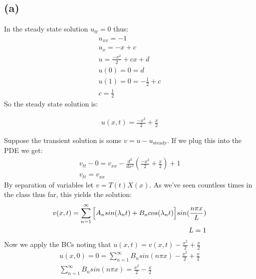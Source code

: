 \documentclass{article}
\begin{document}
\subsection*{\textbf{(a)}}
In the steady state solution $u_{tt} = 0$ thus:
\begin{equation}
\begin{aligned}
u_{xx} = - 1\\
u_x = -x + c\\
u = \frac{-x^2}{2} + cx + d\\
u(0)= 0 = d\\
u(1) = 0 = -\frac{1}{2} + c\\
c = \frac{1}{2}
\end{aligned}
\end{equation}
So the steady state solution is:
\begin{tcolorbox}[minipage,colback=white,arc=0pt,outer arc=0pt]
\begin{equation}
\begin{aligned}
u(x,t)  = \frac{-x^2}{2} + \frac{x}{2}
\end{aligned}
\end{equation}
\end{tcolorbox}
Suppose the transient solution is some $v = u - u_{\text{steady}}$. If we plug this into the PDE we get:
\begin{equation}
\begin{aligned}
v_{tt} - 0 = v_{xx} - \frac{d^2}{dx^2}(\frac{-x^2}{2} + \frac{x}{2}) + 1\\
v_{tt} = v_{xx}
\end{aligned}
\end{equation}
By separation of variables let $v=T(t)X(x)$. As we've seen countless times in the class thus far, this yields the solution:
\begin{equation}
\begin{aligned}
v(x,t) = \sum_{n=1}^{\infty} \Big{[}A_nsin(\lambda_n t) + B_ncos(\lambda_n t) \Big{]}sin(\frac{n\pi x}{L})\\
L = 1\\
\end{aligned}
\end{equation}
Now we apply the BCs noting that $u(x,t) = v(x,t) - \frac{x^2}{2} + \frac{x}{2}$\\
\begin{equation}
\begin{aligned}
u(x,0) = 0 = \sum_{n=1}^{\infty}B_nsin(n\pi x)- \frac{x^2}{2} + \frac{x}{2}\\
\sum_{n=1}^{\infty}B_nsin(n\pi x) = \frac{x^2}{2} - \frac{x}{2}\\
\end{aligned}
\end{equation}
\end{document}

